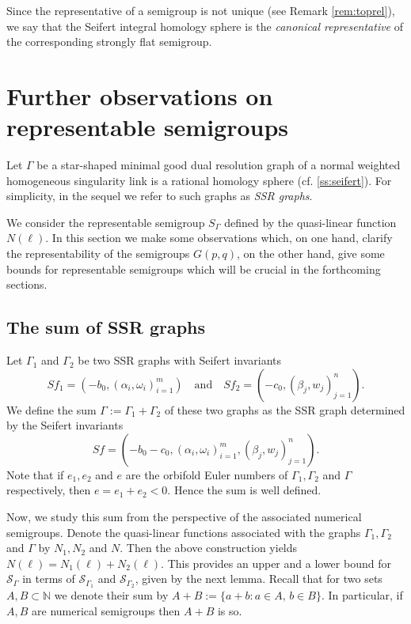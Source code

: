 \documentclass[oneside]{amsart}
\numberwithin{equation}{section}
\numberwithin{equation}{subsection}
\theoremstyle{plain}
\theoremstyle{definition}
\newcommand{\w}{\omega}
\newcommand{\al}{\alpha}
\newcommand{\Se}{\mathcal{S}}
\newcommand{\G}{\Gamma}
\begin{document}
Since the representative of a semigroup is not unique (see Remark \ref{rem:toprel}), we say that the Seifert integral homology sphere is the {\it canonical representative} of the corresponding strongly flat semigroup.


\section{Further observations on representable semigroups}\label{s:rpsg}

Let $\Gamma$ be a star-shaped minimal good dual resolution graph  of a normal weighted homogeneous singularity link is a rational homology sphere (cf. \ref{ss:seifert}). For simplicity, in the sequel we refer to such graphs as {\it SSR graphs}.

We consider the  representable semigroup $S_{\Gamma}$ defined by the quasi-linear function $N(\ell)$. In this section we make some observations which, on one hand, clarify the representability of the semigroups $G(p,q)$, on the other hand, give some bounds for representable semigroups which will be crucial in the forthcoming sections.


\subsection{The sum of SSR graphs}\label{sec:op}
% 

Let $\G_1$ and $\G_2$ be two SSR graphs with Seifert invariants
\[
    Sf_1=\left(-b_0, (\al_i,\w_i )_{i=1}^m \right)
    \quad\text{and}\quad
    Sf_2=\left(-c_0, (\beta_j,w_j )_{j=1}^n \right).
\]
We define the sum $\G:=\G_1+\G_2$ of these two graphs as the SSR graph determined by the
Seifert invariants
\[
    Sf=\left(-b_0-c_0, (\al_i,\w_i )_{i=1}^m,(\beta_j,w_j )_{j=1}^n  \right).
\]
Note that if $e_1,e_2$ and $e$ are the orbifold Euler
numbers of $\G_1,\G_2$ and $\G$ respectively,
then $e=e_1+e_2<0$. Hence the sum is well defined.

Now, we study this sum from the perspective of the associated numerical semigroups. 
Denote the quasi-linear functions associated with the 
graphs $\G_{1},\G_2$ and $\G$ by $N_{1},N_2$ and $N$. Then the 
above construction yields $N(\ell)=N_1(\ell)+N_2(\ell)$. This provides an upper and a lower 
bound for  $\Se_{\G}$ 
in terms of $\Se_{\G_1}$ and $\Se_{\G_2}$, 
given by the next lemma. Recall that  for two sets $A,B\subset \mathbb{N}$ we denote
their sum by $A+B:=\{a+b:a\in A,\,b\in B\}$. In particular, if $A,B$ are numerical semigroups then $A+B$ is so.
\end{document}
